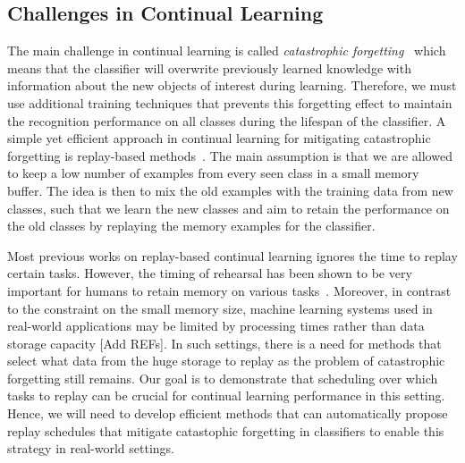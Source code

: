 \subsection{Challenges in Continual Learning}

The main challenge in continual learning is called \textit{catastrophic forgetting}~\cite{mccloskey1989catastrophic} which means that the classifier will overwrite previously learned knowledge with information about the new objects of interest during learning. Therefore, we must use additional training techniques that prevents this forgetting effect to maintain the recognition performance on all classes during the lifespan of the classifier. A simple yet efficient approach in continual learning for mitigating catastrophic forgetting is replay-based methods~\cite{chaudhry2019tiny, hayes2021replay}. The main assumption is that we are allowed to keep a low number of examples from every seen class in a small memory buffer. The idea is then to mix the old examples with the training data from new classes, such that we learn the new classes and aim to retain the performance on the old classes by replaying the memory examples for the classifier. 

Most previous works on replay-based continual learning ignores the time to replay certain tasks. However, the timing of rehearsal has been shown to be very important for humans to retain memory on various tasks~\cite{dempster1989spacing, ebbinghaus2013memory, hawley2008comparison, landauer1978optimum, smolen2016right}. Moreover, in contrast to the constraint on the small memory size, machine learning systems used in real-world applications may be limited by processing times rather than data storage capacity [Add REFs]. In such settings, there is a need for methods that select what data from the huge storage to replay as the problem of catastrophic forgetting still remains. Our goal is to demonstrate that scheduling over which tasks to replay can be crucial for continual learning performance in this setting. Hence, we will need to develop efficient methods that can automatically propose replay schedules that mitigate catastophic forgetting in classifiers to enable this strategy in real-world settings. 



